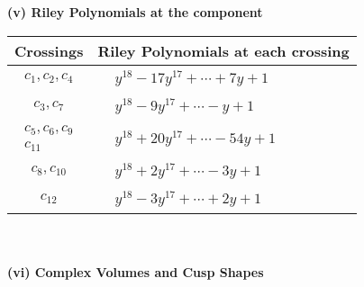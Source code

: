 \documentclass[1p]{elsarticle_modified}
\theoremstyle{definition}
\begin{document}
\newpage\renewcommand{\arraystretch}{1}
\flushleft \textbf{(v) Riley Polynomials at the component}\newline \\
\begin{tabular}{m{50pt}|m{274pt}}
Crossings & \hspace{64pt}Riley Polynomials at each crossing \\
\hline $$\begin{aligned}c_{1},c_{2},c_{4}\end{aligned}$$&$\begin{aligned}
&y^{18}-17 y^{17}+\cdots+7 y+1
\end{aligned}$\\
\hline $$\begin{aligned}c_{3},c_{7}\end{aligned}$$&$\begin{aligned}
&y^{18}-9 y^{17}+\cdots- y+1
\end{aligned}$\\
\hline $$\begin{aligned}c_{5},c_{6},c_{9}\\c_{11}\end{aligned}$$&$\begin{aligned}
&y^{18}+20 y^{17}+\cdots-54 y+1
\end{aligned}$\\
\hline $$\begin{aligned}c_{8},c_{10}\end{aligned}$$&$\begin{aligned}
&y^{18}+2 y^{17}+\cdots-3 y+1
\end{aligned}$\\
\hline $$\begin{aligned}c_{12}\end{aligned}$$&$\begin{aligned}
&y^{18}-3 y^{17}+\cdots+2 y+1
\end{aligned}$\\
\hline
\end{tabular}\\~\\
\newpage\flushleft \textbf{(vi) Complex Volumes and Cusp Shapes}
\end{document}
